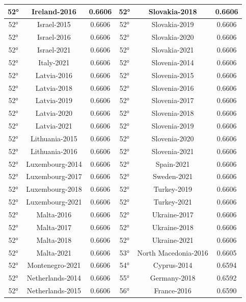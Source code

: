 \documentclass[a4paper,12pt, openright]{report}
\begin{document}
\begin{longtable}[c]{|c|c|c|c|c|c|}
    \hline
    52° & Ireland-2016 & 0.6606 & 52° & Slovakia-2018 & 0.6606 \\
    \hline
    52° & Israel-2015 & 0.6606 & 52° & Slovakia-2019 & 0.6606 \\
    \hline
    52° & Israel-2016  & 0.6606 & 52° & Slovakia-2020 & 0.6606 \\
    \hline
    52° & Israel-2021 & 0.6606 & 52° & Slovakia-2021 & 0.6606 \\
    \hline
    52° & Italy-2021 & 0.6606 & 52° & Slovenia-2014  & 0.6606 \\
    \hline
    52° & Latvia-2016 & 0.6606 & 52° & Slovenia-2015 & 0.6606\\
    \hline
    52° & Latvia-2018 & 0.6606 & 52° & Slovenia-2016 & 0.6606 \\
    \hline
    52° & Latvia-2019 & 0.6606 & 52° & Slovenia-2017 & 0.6606 \\
    \hline
    52° & Latvia-2020  & 0.6606 & 52° & Slovenia-2018 & 0.6606\\
    \hline
    52° & Latvia-2021 & 0.6606 & 52° & Slovenia-2019 & 0.6606 \\
    \hline
    52° & Lithuania-2015 & 0.6606 & 52° & Slovenia-2020 & 0.6606 \\
    \hline
    52° & Lithuania-2016 & 0.6606 & 52° & Slovenia-2021 & 0.6606 \\
    \hline
    52° & Luxembourg-2014 & 0.6606 & 52° & Spain-2021 & 0.6606 \\
    \hline
    52° & Luxembourg-2017 & 0.6606 & 52° & Sweden-2021 & 0.6606 \\
    \hline
    52° & Luxembourg-2018  & 0.6606 & 52° & Turkey-2019 & 0.6606 \\
    \hline
    52° & Luxembourg-2021 & 0.6606 & 52° & Turkey-2021 & 0.6606 \\
    \hline
    52° & Malta-2016 & 0.6606 & 52° & Ukraine-2017  & 0.6606 \\
    \hline
    52° & Malta-2017 & 0.6606 & 52° & Ukraine-2018 & 0.6606 \\
    \hline
    52° & Malta-2018 & 0.6606 & 52° & Ukraine-2021 & 0.6606 \\
    \hline
    52° & Malta-2021 & 0.6606 & 53° & North Macedonia-2016 & 0.6605 \\
    \hline
    52° & Montenegro-2021  & 0.6606 & 54° & Cyprus-2014 & 0.6594 \\
    \hline
    52° & Netherlands-2014 & 0.6606 & 55° & Germany-2018 & 0.6592 \\
    \hline
    52° & Netherlands-2015 & 0.6606  & 56° & France-2016  & 0.6590 \\

\end{longtable}
\end{document}
